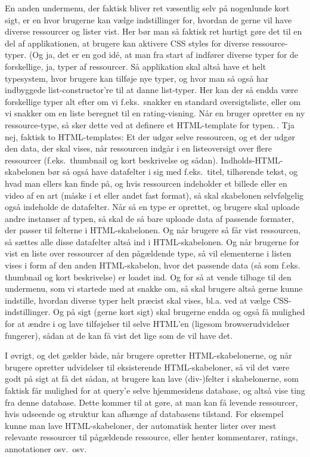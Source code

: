 \documentclass{report}
\begin{document}
En anden undermenu, der faktisk bliver ret væsentlig selv på nogenlunde kort sigt, er en hvor brugerne kan vælge indstillinger for, hvordan de gerne vil have diverse ressourcer og lister vist. Her bør man så faktisk ret hurtigt gøre det til en del af applikationen, at brugere kan aktivere CSS styles for diverse ressource-typer. (Og ja, det er en god idé, at man fra start af indfører diverse typer for de forskellige, ja, typer af ressourcer. Så applikation skal altså have et helt typesystem, hvor brugere kan tilføje nye typer, og hvor man så også har indbyggede list-constructor're til at danne list-typer. Her kan der så endda være forskellige typer alt efter om vi f.eks.\ snakker en standard oversigtsliste, eller om vi snakker om en liste beregnet til en rating-visning. Når en bruger opretter en ny ressource-type, så sker dette ved at definere et HTML-template for typen.\,. Tja nej, faktisk to HTML-templates: Et der udgør selve ressourcen, og et der udgør den data, der skal vises, når ressourcen indgår i en listeoversigt over flere ressourcer (f.eks.\ thumbnail og kort beskrivelse og sådan). Indholds-HTML-skabelonen bør så også have datafelter i sig med f.eks.\ titel, tilhørende tekst, og hvad man ellers kan finde på, og hvis ressourcen indeholder et billede eller en video af en art (måske i et eller andet fast format), så skal skabelonen selvfølgelig også indeholde de datafelter. Når så en type er oprettet, og brugere skal uploade andre instanser af typen, så skal de så bare uploade data af passende formater, der passer til felterne i HTML-skabelonen. Og når brugere så får vist ressourcen, så sættes alle disse datafelter altså ind i HTML-skabelonen. Og når brugerne for vist en liste over ressourcer af den pågældende type, så vil elementerne i listen vises i form af den anden HTML-skabelon, hvor det passende data (så som f.eks. thumbnail og kort beskrivelse) er loadet ind. Og for så at vende tilbage til den undermenu, som vi startede med at snakke om, så skal brugere altså gerne kunne indstille, hvordan diverse typer helt præcist skal vises, bl.a. ved at vælge CSS-indstillinger. Og på sigt (gerne kort sigt) skal brugerne endda og også få mulighed for at ændre i og lave tilføjelser til selve HTML'en (ligesom browserudvidelser fungerer), sådan at de kan få vist det lige som de vil have det. 

I øvrigt, og det gælder både, når brugere opretter HTML-skabelonerne, og når brugere opretter udvidelser til eksisterende HTML-skabeloner, så vil det være godt på sigt at få det sådan, at brugere kan lave (div-)felter i skabelonerne, som faktisk får mulighed for at query'e selve hjemmesidens database, og altså vise ting fra denne database. Dette kommer til at gøre, at man kan få levende ressourcer, hvis udseende og struktur kan afhænge af databasens tilstand. For eksempel kunne man lave HTML-skabeloner, der automatisk henter lister over mest relevante ressourcer til pågældende ressource, eller henter kommentarer, ratings, annotationer osv.\ osv.
\end{document}
